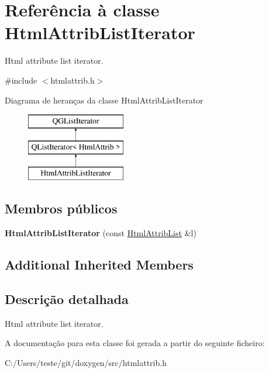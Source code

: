 \hypertarget{class_html_attrib_list_iterator}{\section{Referência à classe Html\-Attrib\-List\-Iterator}
\label{class_html_attrib_list_iterator}
}


Html attribute list iterator.  




{\ttfamily \#include $<$htmlattrib.\-h$>$}

Diagrama de heranças da classe Html\-Attrib\-List\-Iterator\begin{figure}[H]
\begin{center}
\leavevmode
\includegraphics[height=3.000000cm]{class_html_attrib_list_iterator}
\end{center}
\end{figure}
\subsection*{Membros públicos}
\begin{DoxyCompactItemize}
\item 
\hypertarget{class_html_attrib_list_iterator_a94311511d39b25adba4711204ad1d9ae}{{\bfseries Html\-Attrib\-List\-Iterator} (const \hyperlink{class_html_attrib_list}{Html\-Attrib\-List} \&l)}\label{class_html_attrib_list_iterator_a94311511d39b25adba4711204ad1d9ae}

\end{DoxyCompactItemize}
\subsection*{Additional Inherited Members}


\subsection{Descrição detalhada}
Html attribute list iterator. 

A documentação para esta classe foi gerada a partir do seguinte ficheiro\-:\begin{DoxyCompactItemize}
\item 
C\-:/\-Users/teste/git/doxygen/src/htmlattrib.\-h\end{DoxyCompactItemize}
